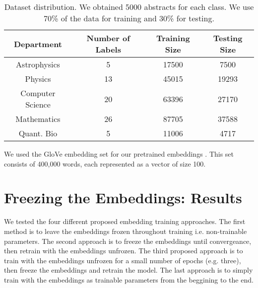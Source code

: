 \begin{center}
  \begin{table}\begin{tabular}{||c c c c||}
 \hline
 Department & Number of Labels & Training Size & Testing Size\\ [0.5ex]
 \hline\hline
Astrophysics & 5 & 17500 & 7500\\
Physics & 13 & 45015 & 19293\\
Computer Science & 20 & 63396 & 27170 \\
Mathematics & 26 & 87705 & 37588 \\
Quant. Bio & 5 & 11006 & 4717\\
 [1ex]\hline\end{tabular}\caption{Dataset distribution. We obtained 5000 abstracts for each class. We use 70\% of the data for
 training and 30\% for testing.}\end{table}
\end{center}

We used the GloVe embedding set for our pretrained embeddings \cite{pennington2014glove}. This set consists of 400,000 words, each represented
as a vector of size 100.

\section{Freezing the Embeddings: Results}
We tested the four different proposed embedding training approaches.
The first method is to leave the embeddings frozen throughout training i.e. non-trainable parameters.
The second approach is to freeze the embeddings until convergeance, then retrain with the embeddings unfrozen.
The third proposed approach is to train with the embeddings unfrozen for a small number of epochs (e.g. three), then
freeze the embeddings and retrain the model.
The last approach is to simply train with the embeddings as trainable parameters from the beggining to the end.

